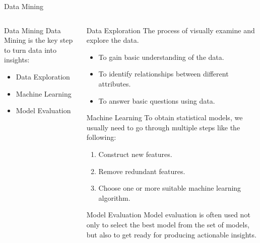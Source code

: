 \documentclass[10pt]{beamer}
\begin{document}
   \begin{frame}{Data Mining}
     \begin{columns}
       \begin{column}[T]{0.48\textwidth}
         \begin{block}{Data Mining}
          Data Mining is the key step to turn data into insights:
          \smallskip
           \begin{itemize}
             \item<1-> \alert<2>{Data Exploration}
             \smallskip
             \item<1-> \alert<3>{Machine Learning}
             \smallskip
             \item<1-> \alert<4>{Model Evaluation}
           \end{itemize}
         \end{block}
       \end{column}
       \begin{column}[T]{0.48\textwidth}
         \begin{overprint}
             \begin{alertblock}{Data Exploration}
               The process of visually examine and explore the data.
               \smallskip
                 \begin{itemize}
                   \item To gain basic understanding of the data. 
                   \item To identify relationships between different attributes.
                   \item To answer basic questions using data.
                 \end{itemize}
             \end{alertblock}
             \begin{alertblock}{Machine Learning}
               To obtain statistical models, we usually need to go through multiple steps like 
               the following:
               \smallskip
                 \begin{enumerate}
                   \item Construct new features.
                   \item Remove redundant features.
                   \item Choose one or more suitable machine learning algorithm.
                 \end{enumerate}
             \end{alertblock}
             \begin{alertblock}{Model Evaluation}
               Model evaluation is often used not only to select the best model from 
               the set of models, but also to get ready for producing actionable insights.
             \end{alertblock}
         \end{overprint}
       \end{column}   
     \end{columns}
   \end{frame}
\end{document}
